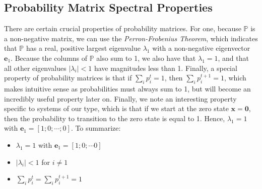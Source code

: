 \documentclass[superscriptaddress]{revtex4-1}
\newcommand{\prob}{\mathbb{P}}
\begin{document}
\subsection{Probability Matrix Spectral Properties}
There are certain crucial properties of probability matrices. For one, because $\mathbb{P}$ is a non-negative matrix, we can use the \emph{Perron-Frobenius Theorem}, which indicates that $\prob$ has a real, positive largest eigenvalue $\lambda_1$ with a non-negative eigenvector $\bm{e}_1$. Because the columns of $\prob$ also sum to 1, we also have that $\lambda_1 = 1$, and that all other eigenvalues $|\lambda_i| < 1$ have magnitudes less than 1. Finally, a special property of probability matrices is that if $\sum_i p_i^t = 1$, then $\sum_i p_i^{t+1} = 1$, which makes intuitive sense as probabilities must always sum to 1, but will become an incredibly useful property later on. Finally, we note an interesting property specific to systems of our type, which is that if we start at the zero state $\bm{x} = \bm{0}$, then the probability to transition to the zero state is equal to 1. Hence, $\lambda_1 = 1$ with $\bm{e}_1 = [1; 0; \dotsm; 0]$. To summarize:
\begin{itemize}
	\item $\lambda_1 = 1$ with $\bm{e}_1 = [1; 0; \dotsm 0]$
	\item $|\lambda_i| < 1$ for $i \neq 1$
	\item $\sum_i p_i^t = \sum_i p_i^{t+1} = 1$
\end{itemize}
\end{document}
